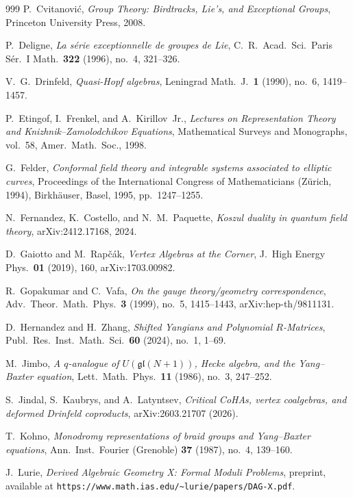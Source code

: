 \documentclass[11pt]{memoir}
\begin{document}
\begin{thebibliography}{999}
P.~Cvitanovi\'{c}, \emph{Group Theory: Birdtracks, Lie's, and Exceptional Groups}, Princeton University Press, 2008.

P.~Deligne, \emph{La s\'erie exceptionnelle de groupes de Lie}, C.~R.~Acad.\ Sci.\ Paris S\'er.~I Math.\ \textbf{322} (1996), no.~4, 321--326.

V.~G.~Drinfeld, \emph{Quasi-Hopf algebras}, Leningrad Math.\ J.\ \textbf{1} (1990), no.~6, 1419--1457.

P.~Etingof, I.~Frenkel, and A.~Kirillov~Jr., \emph{Lectures on Representation Theory and Knizhnik--Zamolodchikov Equations}, Mathematical Surveys and Monographs, vol.~58, Amer.\ Math.\ Soc., 1998.

G.~Felder, \emph{Conformal field theory and integrable systems associated to elliptic curves}, Proceedings of the International Congress of Mathematicians (Z\"urich, 1994), Birkh\"auser, Basel, 1995, pp.~1247--1255.

N.~Fernandez, K.~Costello, and N.~M.~Paquette, \emph{Koszul duality in quantum field theory}, arXiv:2412.17168, 2024.

D.~Gaiotto and M.~Rap\v{c}\'ak, \emph{Vertex Algebras at the Corner}, J.\ High Energy Phys.\ \textbf{01} (2019), 160, arXiv:1703.00982.

R.~Gopakumar and C.~Vafa, \emph{On the gauge theory/geometry correspondence}, Adv.\ Theor.\ Math.\ Phys.\ \textbf{3} (1999), no.~5, 1415--1443, arXiv:hep-th/9811131.

D.~Hernandez and H.~Zhang, \emph{Shifted Yangians and Polynomial $R$-Matrices}, Publ.\ Res.\ Inst.\ Math.\ Sci.\ \textbf{60} (2024), no.~1, 1--69.

M.~Jimbo, \emph{A $q$-analogue of $U(\mathfrak{gl}(N+1))$, Hecke algebra, and the Yang--Baxter equation}, Lett.\ Math.\ Phys.\ \textbf{11} (1986), no.~3, 247--252.

 S.~Jindal, S.~Kaubrys, and A.~Latyntsev, \emph{Critical CoHAs, vertex coalgebras, and deformed Drinfeld coproducts}, arXiv:2603.21707 (2026).

T.~Kohno, \emph{Monodromy representations of braid groups and Yang--Baxter equations}, Ann.\ Inst.\ Fourier (Grenoble) \textbf{37} (1987), no.~4, 139--160.

J.~Lurie, \emph{Derived Algebraic Geometry X: Formal Moduli Problems}, preprint, available at \texttt{https://www.math.ias.edu/\textasciitilde lurie/papers/DAG-X.pdf}.


\end{thebibliography}
\end{document}
